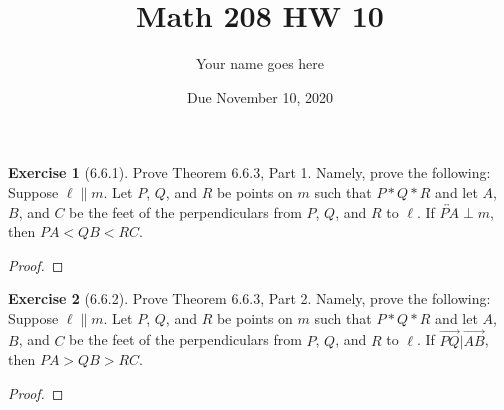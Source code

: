 \documentclass[11pt]{article}		%
\title{Math 208 HW 10}
\author{Your name goes here}  %
\date{Due November 10, 2020}
\newcommand{\lin}[1]{\overleftrightarrow{#1}}
\newcommand{\ray}[1]{\overrightarrow{#1}}
\theoremstyle{definition}
\newtheorem*{ex}{Exercise}
\begin{document}
	\maketitle
	
	

\begin{ex}[6.6.1]
Prove Theorem 6.6.3, Part 1.  Namely, prove the following:  Suppose $\ell \parallel m$. Let $P$, $Q$, and $R$ be points on $m$ such that $P * Q * R$ and let $A$, $B$, and $C$ be the feet of the perpendiculars from $P$, $Q$, and $R$ to $\ell$. If $\lin{PA} \perp m$, then $PA < QB < RC$.
	
\end{ex}

\begin{proof} 
	
\end{proof}


\vspace{1in} %





\begin{ex}[6.6.2]
	Prove Theorem 6.6.3, Part 2.  Namely, prove the following:  Suppose $\ell \parallel m$. Let $P$, $Q$, and $R$ be points on $m$ such that $P * Q * R$ and let $A$, $B$, and $C$ be the feet of the perpendiculars from $P$, $Q$, and $R$ to $\ell$. If $\ray{PQ} | \ray{AB}$, then $PA > QB > RC$.
	
\end{ex}

\begin{proof} 
	
\end{proof}


\vspace{1in} %
\end{document}
